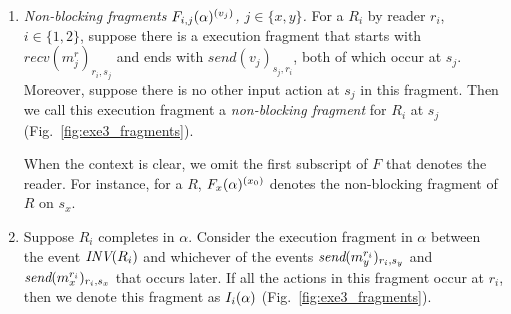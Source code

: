 \begin{enumerate}[leftmargin=*]
%
%
\item \emph{Non-blocking fragments $\frage{F_{i,j}}{\alpha}{v_j}$, $j \in \{x, y\}$.}
 For a \rot{} $R_i$ by reader $r_i$, $i\in \{1, 2\}$, suppose there is a execution fragment that starts with $recv(m_j^r)_{r_i, s_j}$ and ends with
 $send(v_j)_{s_j, r_i}$, both of which  occur  at $s_j$. Moreover, suppose there is  
 no other input action at $s_j$ in this fragment. Then we call this execution fragment 
   a \emph{non-blocking fragment} for $R_i$ at  $s_j$ (Fig.~\ref{fig:exe3_fragments}).

   When the context is clear, we omit the first subscript of $F$ that denotes the reader. For instance, for a \rot{} $R$, $\frage{F_{x}}{\alpha}{x_0}$ denotes the non-blocking fragment of $R$ on $s_x$.  

%
%
\item Suppose \rot{} $R_i$ completes in $\alpha$. Consider the execution fragment in $\alpha$  between the event 
${\textit{INV}(R_i)}$  and  whichever of the events  ${\textit{send}(m_y^{r_i})_{r_i, s_y}}$ and  ${\textit{send}(m_x^{r_i})_{r_i, s_x}}$ that occurs later. If all the 
actions in this fragment occur at  $r_i$, then we denote this fragment as $\frage{I_i}{\alpha}{}$ (Fig.~\ref{fig:exe3_fragments}).  


\end{enumerate}
